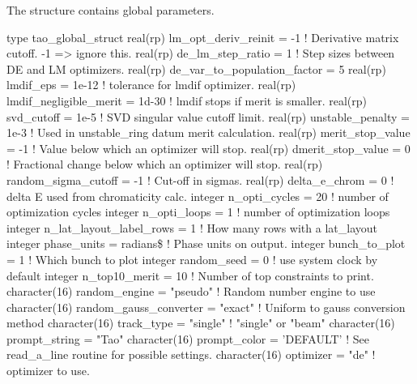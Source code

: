 {{{{{{{The  structure contains \tao global parameters.
\begin{example}
type tao_global_struct
  real(rp) lm_opt_deriv_reinit = -1   ! Derivative matrix cutoff. -1 => ignore this.
  real(rp) de_lm_step_ratio = 1       ! Step sizes between DE and LM optimizers.
  real(rp) de_var_to_population_factor = 5 
  real(rp) lmdif_eps = 1e-12          ! tolerance for lmdif optimizer.
  real(rp) lmdif_negligible_merit = 1d-30  ! lmdif stops if merit is smaller.
  real(rp) svd_cutoff = 1e-5          ! SVD singular value cutoff limit.
  real(rp) unstable_penalty = 1e-3    ! Used in unstable_ring datum merit calculation.
  real(rp) merit_stop_value = -1      ! Value below which an optimizer will stop.
  real(rp) dmerit_stop_value = 0      ! Fractional change below which an optimizer will stop.
  real(rp) random_sigma_cutoff = -1   ! Cut-off in sigmas.
  real(rp) delta_e_chrom = 0          ! delta E used from chromaticity calc.
  integer n_opti_cycles = 20          ! number of optimization cycles
  integer n_opti_loops = 1            ! number of optimization loops
  integer n_lat_layout_label_rows = 1 ! How many rows with a lat_layout
  integer phase_units = radians\$      ! Phase units on output.
  integer bunch_to_plot = 1           ! Which bunch to plot
  integer random_seed = 0             ! use system clock by default
  integer n_top10_merit = 10          ! Number of top constraints to print.
  character(16)  random_engine = "pseudo"         ! Random number engine to use
  character(16)  random_gauss_converter = "exact" ! Uniform to gauss conversion method
  character(16)  track_type = "single"            ! "single" or "beam" 
  character(16)  prompt_string = "Tao"
  character(16)  prompt_color = 'DEFAULT'         ! See read_a_line routine for possible settings.
  character(16)  optimizer     = "de"             ! optimizer to use.

\end{example}}}}}}}}
